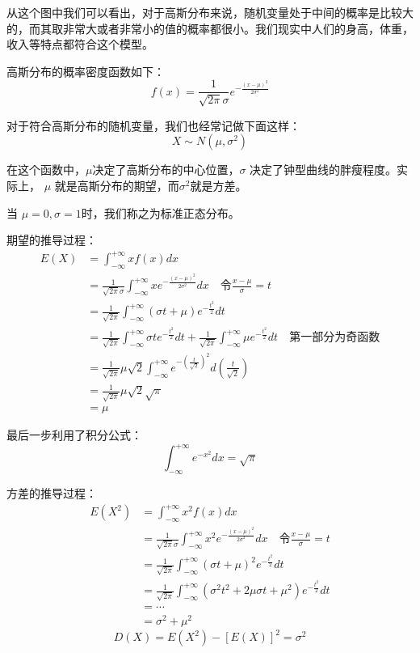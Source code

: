 \documentclass[12pt]{article}
\begin{document}
从这个图中我们可以看出，对于高斯分布来说，随机变量处于中间的概率是比较大的，而其取非常大或者非常小的值的概率都很小。我们现实中人们的身高，体重，收入等特点都符合这个模型。

高斯分布的概率密度函数如下：
$$
f(x) = \frac{1}{\sqrt{2 \pi}\sigma}e^{-\frac{(x - \mu)^2}{2\sigma^2}}
$$

对于符合高斯分布的随机变量，我们也经常记做下面这样：
$$
X \sim N(\mu, \sigma^2)
$$

在这个函数中，$\mu$决定了高斯分布的中心位置，$\sigma$ 决定了钟型曲线的胖瘦程度。实际上，
$\mu$ 就是高斯分布的期望，而$\sigma^2$就是方差。

当 $\mu = 0, \sigma = 1$时，我们称之为标准正态分布。

期望的推导过程：
\begin{align*}
E(X) &= \int_{-\infty}^{+\infty}xf(x)dx \\
&= \frac{1}{\sqrt{2 \pi}\sigma} \int_{-\infty}^{+\infty}xe^{-\frac{(x - \mu)^2}{2\sigma^2}}dx \quad \text{令} \frac{x-\mu}{\sigma} = t \\
&= \frac{1}{\sqrt{2 \pi}}\int_{-\infty}^{+\infty}(\sigma t+\mu)e^{-\frac{t^2}{2}}dt \\
&=  \frac{1}{\sqrt{2 \pi}}\int_{-\infty}^{+\infty}\sigma te^{-\frac{t^2}{2}}dt + \frac{1}{\sqrt{2 \pi}}\int_{-\infty}^{+\infty}{\mu}e^{-\frac{t^2}{2}}dt \quad \text{第一部分为奇函数} \\
&= \frac{1}{\sqrt{2 \pi}}{\mu}{\sqrt{2}}\int_{-\infty}^{+\infty}e^{-(\frac{t}{\sqrt{2}})^2}d{(\frac{t}{\sqrt{2}})} \\
&=  \frac{1}{\sqrt{2 \pi}}{\mu}{\sqrt{2}\sqrt{\pi}} \\
&= \mu
\end{align*}

最后一步利用了积分公式：
$$
\int_{-\infty}^{+\infty}e^{-x^2}dx = \sqrt{\pi}
$$

方差的推导过程：
\begin{align*}
E(X^2) &= \int_{-\infty}^{+\infty}x^2f(x)dx \\
&= \frac{1}{\sqrt{2 \pi}\sigma} \int_{-\infty}^{+\infty}x^2e^{-\frac{(x - \mu)^2}{2\sigma^2}}dx \quad \text{令} \frac{x-\mu}{\sigma} = t \\
&= \frac{1}{\sqrt{2 \pi}}\int_{-\infty}^{+\infty}(\sigma t+\mu)^2e^{-\frac{t^2}{2}}dt \\
&= \frac{1}{\sqrt{2 \pi}}\int_{-\infty}^{+\infty}({\sigma }^2t^2+2\mu\sigma t+{\mu}^2)e^{-\frac{t^2}{2}}dt \\
&= \cdots \\
&= {\sigma}^2 + {\mu}^2
\end{align*}
$$
D(X) = E(X^2) - [E(X)]^2 = {\sigma}^2
$$
\end{document}
